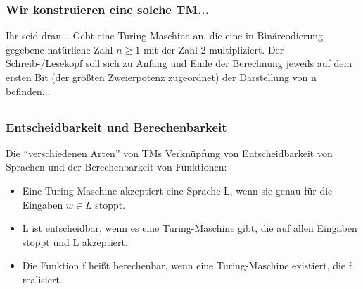\begin{frame}
	\frametitle{Wir konstruieren eine solche TM...}

	\begin{block}{Ihr seid dran...}
	Gebt eine Turing-Maschine an, die eine in Binärcodierung gegebene natürliche Zahl $n\geq 1$
mit der Zahl $2$ multipliziert. Der Schreib-/Lesekopf soll sich zu Anfang und Ende der Berechnung
jeweils auf dem ersten Bit (der größten Zweierpotenz zugeordnet) der Darstellung von
n befinden...
	\end{block}
\end{frame}

\subsection*{}
\begin{frame}
  \frametitle{Entscheidbarkeit und Berechenbarkeit}
\begin{block}{Die "`verschiedenen Arten"' von TMs}
Verknüpfung von Entscheidbarkeit von Sprachen und der Berechenbarkeit
von Funktionen:

\begin{itemize}
	\item Eine Turing-Maschine akzeptiert eine Sprache L, wenn sie genau für die Eingaben $w \in L$ stoppt.
	\item L ist entscheidbar, wenn es eine Turing-Maschine gibt, die auf allen Eingaben stoppt und L akzeptiert.
	\item Die Funktion f heißt berechenbar, wenn eine Turing-Maschine existiert, die f realisiert.
\end{itemize}
\end{block}
\end{frame}


